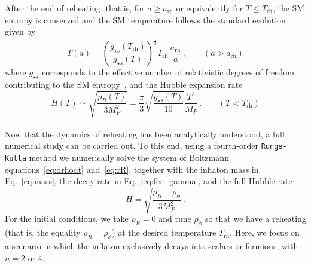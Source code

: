\documentclass[a4paper,11pt]{article}
\newcommand{\rR}{\rho_R}
\newcommand{\rp}{\rho_\phi}
\newcommand{\gss}{g_{\star s}}
\newcommand{\arh}{a_\text{rh}}
\newcommand{\Trh}{T_\text{rh}}
\begin{document}
After the end of reheating, that is, for $a \geq \arh$ or equivalently for $T \leq \Trh$, the SM entropy is conserved and the SM temperature follows the standard evolution given by
\begin{equation} \label{eq:TSM}
    T(a) = \left(\frac{\gss(\Trh)}{\gss(T)}\right)^\frac13 \Trh\, \frac{\arh}{a}\,,
    \qquad(a>\arh)
\end{equation}
where $\gss$ corresponds to the effective number of relativistic degrees of freedom contributing to the SM entropy~\cite{Drees:2015exa}, and the Hubble expansion rate
\begin{equation}
    H(T) \simeq \sqrt{\frac{\rR(T)}{3 M_P^2}} = \frac{\pi}{3} \sqrt{\frac{\gss(T)}{10}} \frac{T^2}{M_P}\,.
    \qquad(T<\Trh)
\end{equation}\\

Now that the dynamics of reheating has been analytically understood, a full numerical study can be carried out. To this end, using a fourth-order \texttt{Runge-Kutta} method we numerically solve the system of Boltzmann equations~\eqref{eq:drhodt} and~\eqref{eq:rR}, together with the inflaton mass  in Eq.~\eqref{eq:mass}, the decay rate in Eq.~\eqref{eq:fer_gamma}, and the full Hubble rate
\begin{equation} \label{eq:H}
    H = \sqrt{\frac{\rR + \rp}{3 M_P^2}}\,.
\end{equation}
For the initial conditions, we take $\rR = 0$ and tune $\rp$ so that we have a reheating (that is, the equality $\rR = \rp$) at the desired temperature $\Trh$.
Here, we focus on a scenario in which the inflaton exclusively decays into scalars or fermions, with $n = 2$ or 4. 
\end{document}
